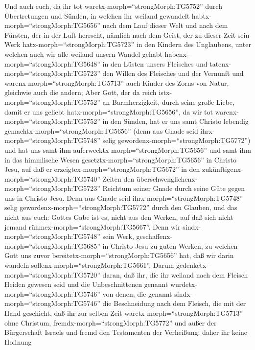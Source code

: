  Und auch euch, da ihr tot
waretx-morph=``strongMorph:TG5752'' durch Übertretungen und Sünden,
 in welchen ihr weiland gewandelt
habtx-morph=``strongMorph:TG5656'' nach dem Lauf dieser Welt und nach
dem Fürsten, der in der Luft herrscht, nämlich nach dem Geist, der zu
dieser Zeit sein Werk hatx-morph=``strongMorph:TG5723'' in den Kindern
des Unglaubens,  unter welchen auch wir alle weiland unsern
Wandel gehabt habenx-morph=``strongMorph:TG5648'' in den Lüsten unsers
Fleisches und tatenx-morph=``strongMorph:TG5723'' den Willen des
Fleisches und der Vernunft und warenx-morph=``strongMorph:TG5713'' auch
Kinder des Zorns von Natur, gleichwie auch die andern;  Aber
Gott, der da reich istx-morph=``strongMorph:TG5752'' an Barmherzigkeit,
durch seine große Liebe, damit er uns geliebt
hatx-morph=``strongMorph:TG5656'',  da wir tot
warenx-morph=``strongMorph:TG5752'' in den Sünden, hat er uns samt
Christo lebendig gemachtx-morph=``strongMorph:TG5656'' (denn aus Gnade
seid ihrx-morph=``strongMorph:TG5748'' selig
gewordenx-morph=``strongMorph:TG5772'')  und hat uns samt
ihm auferwecktx-morph=``strongMorph:TG5656'' und samt ihm in das
himmlische Wesen gesetztx-morph=``strongMorph:TG5656'' in Christo Jesu,
 auf daß er erzeigtex-morph=``strongMorph:TG5672'' in den
zukünftigenx-morph=``strongMorph:TG5740'' Zeiten den
überschwenglichenx-morph=``strongMorph:TG5723'' Reichtum seiner Gnade
durch seine Güte gegen uns in Christo Jesu.  Denn aus Gnade
seid ihrx-morph=``strongMorph:TG5748'' selig
gewordenx-morph=``strongMorph:TG5772'' durch den Glauben, und das nicht
aus euch: Gottes Gabe ist es,  nicht aus den Werken, auf daß
sich nicht jemand rühmex-morph=``strongMorph:TG5667''. 
Denn wir sindx-morph=``strongMorph:TG5748'' sein Werk,
geschaffenx-morph=``strongMorph:TG5685'' in Christo Jesu zu guten
Werken, zu welchen Gott uns zuvor bereitetx-morph=``strongMorph:TG5656''
hat, daß wir darin wandeln sollenx-morph=``strongMorph:TG5661''.
 Darum gedenketx-morph=``strongMorph:TG5720'' daran, daß
ihr, die ihr weiland nach dem Fleisch Heiden gewesen seid und die
Unbeschnittenen genannt wurdetx-morph=``strongMorph:TG5746'' von denen,
die genannt sindx-morph=``strongMorph:TG5746'' die Beschneidung nach dem
Fleisch, die mit der Hand geschieht,  daß ihr zur selben
Zeit waretx-morph=``strongMorph:TG5713'' ohne Christum,
fremdx-morph=``strongMorph:TG5772'' und außer der Bürgerschaft Israels
und fremd den Testamenten der Verheißung; daher ihr keine Hoffnung
